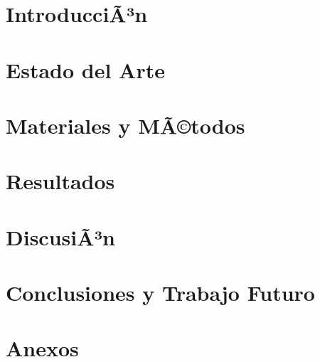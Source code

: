﻿\documentclass[a4paper,12pt]{article}
\begin{document}
\clearpage
\hypersetup{pageanchor=true}

\section{IntroducciÃ³n}

\clearpage

\section{Estado del Arte}

\clearpage

\section{Materiales y MÃ©todos}

\clearpage

\section{Resultados}

\clearpage

\section{DiscusiÃ³n}

\clearpage

\section{Conclusiones y Trabajo Futuro}


\clearpage
{}


\clearpage
\section*{Anexos}

\end{document}
